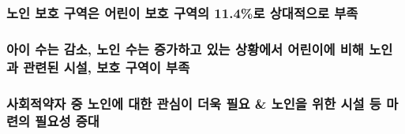 \documentclass[11pt]{article}
\begin{document}
    \subsubsection{노인 보호 구역은 어린이 보호 구역의 11.4\%로 상대적으로
부족}\label{uxb178uxc778-uxbcf4uxd638-uxad6cuxc5eduxc740-uxc5b4uxb9b0uxc774-uxbcf4uxd638-uxad6cuxc5eduxc758-11.4uxb85c-uxc0c1uxb300uxc801uxc73cuxb85c-uxbd80uxc871}

\subsubsection{아이 수는 감소, 노인 수는 증가하고 있는 상황에서 어린이에
비해 노인과 관련된 시설, 보호 구역이
부족}\label{uxc544uxc774-uxc218uxb294-uxac10uxc18c-uxb178uxc778-uxc218uxb294-uxc99duxac00uxd558uxace0-uxc788uxb294-uxc0c1uxd669uxc5d0uxc11c-uxc5b4uxb9b0uxc774uxc5d0-uxbe44uxd574-uxb178uxc778uxacfc-uxad00uxb828uxb41c-uxc2dcuxc124-uxbcf4uxd638-uxad6cuxc5eduxc774-uxbd80uxc871}

\subsubsection{사회적약자 중 노인에 대한 관심이 더욱 필요 \& 노인을 위한
시설 등 마련의 필요성
증대}\label{uxc0acuxd68cuxc801uxc57duxc790-uxc911-uxb178uxc778uxc5d0-uxb300uxd55c-uxad00uxc2ecuxc774-uxb354uxc6b1-uxd544uxc694-uxb178uxc778uxc744-uxc704uxd55c-uxc2dcuxc124-uxb4f1-uxb9c8uxb828uxc758-uxd544uxc694uxc131-uxc99duxb300}


    
    
    
    
\end{document}
